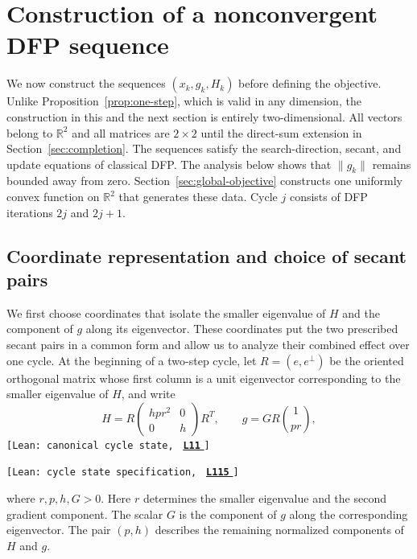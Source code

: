 \documentclass[11pt]{article}
\newcommand{\R}{\mathbb R}
\newcommand{\leanLinkText}[1]{%
  \underline{\textbf{#1}}%
}
\newcommand{\leanSnapshot}{e308927f5b7930bdd002f0c0e42b9d112ad821cb}
\newcommand{\leanClaimTag}[3]{%
  {\footnotesize\texttt{[Lean: #1, }}%
  \href{https://github.com/imathwy/DFP_wolfe_local/blob/\leanSnapshot/#2?plain=1\#L#3}%
    {\leanLinkText{\footnotesize\texttt{L#3}}}%
  {\footnotesize\texttt{]}}\enspace
}
\begin{document}
\section{Construction of a nonconvergent DFP sequence}
\label{sec:alternating-sequence}

We now construct the sequences $(x_k,g_k,H_k)$ before defining the objective.
Unlike Proposition~\ref{prop:one-step}, which is valid in any dimension, the
construction in this and the next section is entirely two-dimensional.  All
vectors belong to $\R^2$ and all matrices are $2\times2$ until the direct-sum
extension in Section~\ref{sec:completion}.  The sequences satisfy the
search-direction, secant, and update equations of classical DFP.  The analysis
below shows that $\|g_k\|$ remains bounded away from zero.
Section~\ref{sec:global-objective} constructs one uniformly convex function on
$\R^2$ that generates these data.  Cycle $j$ consists of DFP iterations
$2j$ and $2j+1$.

\subsection{Coordinate representation and choice of secant pairs}

We first choose coordinates that isolate the smaller eigenvalue of $H$ and
the component of $g$ along its eigenvector.  These coordinates put the two
prescribed secant pairs in a common form and allow us to analyze their
combined effect over one cycle.  At the beginning of a two-step cycle, let
$R=(e,e^\perp)$ be the oriented
orthogonal matrix whose first column is a unit eigenvector corresponding to
the smaller eigenvalue of $H$, and write
\begin{equation}\label{eq:coordinate-representation}
H=R\begin{pmatrix}hpr^2&0\\0&h\end{pmatrix}R^T,
\qquad
g=GR\binom{1}{pr},
\end{equation}
\leanClaimTag{canonical cycle state}{DFPWolfe/A_uniformly_convex_counterexample_to_global_convergence_of_DFP_under_weak_Wolfe_/Definition_3_1_Canonical_cycle_boundary_state.lean}{11}
\leanClaimTag{cycle state specification}{ReasLib/Optimization/DFP/CycleBoundaryState.lean}{115}
where $r,p,h,G>0$.  Here $r$ determines the smaller eigenvalue and the second
gradient component.  The scalar $G$ is the component of $g$ along the
corresponding eigenvector.  The pair $(p,h)$ describes the remaining normalized
components of $H$ and $g$.
\end{document}
